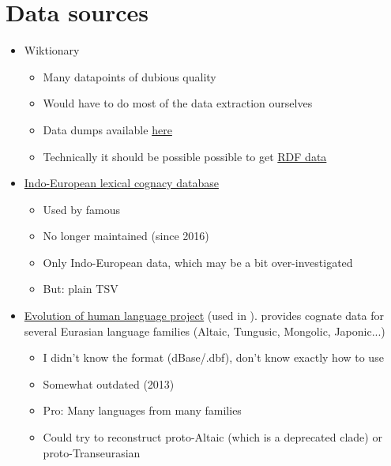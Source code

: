 \documentclass[a4paper, 10pt]{article}
\begin{document}
\section{Data sources} 
\begin{itemize}
    \item Wiktionary 
    \begin{itemize}
        \item Many datapoints of dubious quality
        \item Would have to do most of the data extraction ourselves
        \item Data dumps available \href{https://dumps.wikimedia.org/enwiktionary/}{here}
        \item Technically it should be possible possible to get \href{https://wiki.dbpedia.org/wiktionary-rdf-extraction}{RDF data}
    \end{itemize}
    \item \href{http://ielex.mpi.nl/}{Indo-European lexical cognacy database}
    \begin{itemize}
        \item Used by famous \cite{bouckaert_et_al:2012}
        \item No longer maintained (since 2016)
        \item Only Indo-European data, which may be a bit over-investigated
        \item But: plain TSV
    \end{itemize}
    \item \href{https://starling.rinet.ru/downl.php?lan=en}{Evolution of human language project} (used in \cite{hruschka_detecting_2015}).
    provides cognate data for several Eurasian language families (Altaic, Tungusic, Mongolic, Japonic...)
    \begin{itemize}
        \item I didn't know the format (dBase/.dbf), don't know exactly how to use 
        \item Somewhat outdated (2013)
        \item Pro: Many languages from many families
        \item Could try to reconstruct proto-Altaic (which is a deprecated clade) or proto-Transeurasian
    \end{itemize}
\end{itemize}

\newpage
\end{document}
